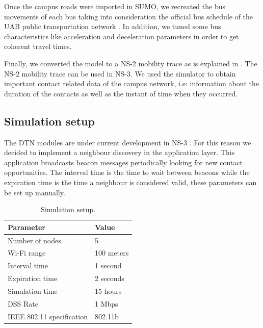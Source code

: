Once the campus roads were imported in SUMO, we recreated the bus movements of each bus taking into consideration the official bus schedule of the UAB public transportation network \cite{bus-schedule}. In addition, we tuned some bus characteristics like acceleration and deceleration parameters in order to get coherent travel times.

Finally, we converted the model to a NS-2 mobility trace as is explained in \cite{sumo-to-ns-2}. The NS-2 mobility trace can be used in NS-3. We used the simulator to obtain important contact related data of the campus network, i.e: information about the duration of the contacts as well as the instant of time when they occurred.

\subsection{Simulation setup}


The DTN modules are under current development in NS-3 \cite{ns-3-dtn}. For this reason we decided to implement a neighbour discovery in the application layer. This application broadcasts beacon messages periodically looking for new contact opportunities. The interval time is the time to wait between beacons while the expiration time is the time a neighbour is considered valid, these parameters can be set up manually.

\begin{table}[h!]
\centering
\begin{tabular}{l|l}
Parameter & Value \\
\hline
Number of nodes & 5 \\
Wi-Fi range & 100 meters \\
Interval time & 1 second \\
Expiration time & 2 seconds \\
Simulation time & 15 hours \\
DSS Rate & 1 Mbps \\
IEEE 802.11 specification & 802.11b
\end{tabular}
\caption{Simulation setup.}
\label{table:simulation-parameters}
\end{table}

